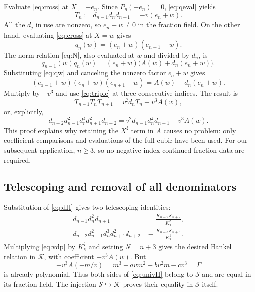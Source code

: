 \documentclass[11pt,a4paper]{article}
\numberwithin{equation}{section}
\theoremstyle{definition}
\begin{document}
Evaluate \eqref{eq:cross} at $X=-e_n$. Since $P_n(-e_n)=0$,
\eqref{eq:qeval} yields
\begin{equation}\label{eq:triple}
 T_n:=d_{n-1}d_nd_{n+1}=-v(e_n+w).
\end{equation}
All the $d_j$ in use are nonzero, so $e_n+w\ne0$ in the fraction field.
On the other hand, evaluating \eqref{eq:cross} at $X=w$ gives
\begin{equation}\label{eq:qw}
 q_n(w)=(e_n+w)(e_{n+1}+w).
\end{equation}
The norm relation \eqref{eq:N}, also evaluated at $w$ and divided by $d_n$,
is
\[
 q_{n-1}(w)q_n(w)=(e_n+w)\bigl(A(w)+d_n(e_n+w)\bigr).
\]
Substituting \eqref{eq:qw} and canceling the nonzero factor $e_n+w$ gives
\begin{equation}\label{eq:ecubic}
 (e_{n-1}+w)(e_n+w)(e_{n+1}+w)=A(w)+d_n(e_n+w).
\end{equation}
Multiply by $-v^3$ and use \eqref{eq:triple} at three consecutive indices.
The result is
\begin{equation}\label{eq:Tlocal}
 T_{n-1}T_nT_{n+1}=v^2d_nT_n-v^3A(w),
\end{equation}
or, explicitly,
\begin{equation}\label{eq:vdp}
 d_{n-2}d_{n-1}^2d_n^3d_{n+1}^2d_{n+2}
 =v^2d_{n-1}d_n^2d_{n+1}-v^3A(w).
\end{equation}
This proof explains why retaining the $X^2$ term in $A$ causes no problem:
only coefficient comparisons and evaluations of the full cubic have been
used. For our subsequent application, $n\geq3$, so no negative-index
continued-fraction data are required.

\subsection{Telescoping and removal of all denominators}
Substitution of \eqref{eq:dH} gives two telescoping identities:
\begin{align}\label{eq:telescope1}
 d_{n-1}d_n^2d_{n+1}&=\frac{K_{n-2}K_{n+2}}{K_n^2},\\
 d_{n-2}d_{n-1}^2d_n^3d_{n+1}^2d_{n+2}
 &=\frac{K_{n-3}K_{n+3}}{K_n^2}.\label{eq:telescope2}
\end{align}
Multiplying \eqref{eq:vdp} by $K_n^2$ and setting $N=n+3$ gives the desired
Hankel relation in $\mathcal K$, with coefficient $-v^3A(w)$. But
\begin{equation}\label{eq:clearinvariant}
 -v^3A(-m/v)=m^3-avm^2+bv^2m-cv^3=\Gamma
\end{equation}
is already polynomial. Thus both sides of \eqref{eq:univH} belong to
$\mathcal S$ and are equal in its fraction field. The injection
$\mathcal S\hookrightarrow\mathcal K$ proves their equality in
$\mathcal S$ itself.
\end{document}
